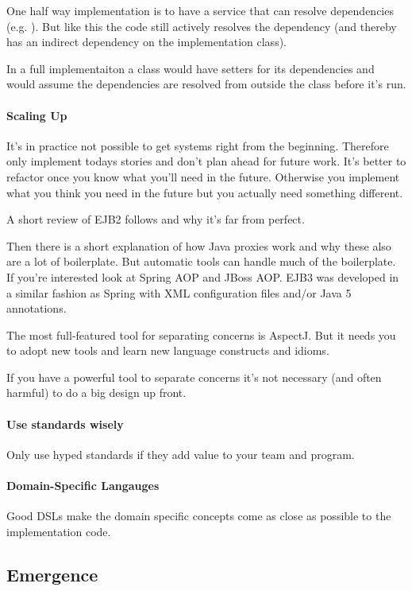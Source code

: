 \documentclass[a4paper, twocolumn]{article}
\newcommand{\code}[1]{\texttt{\color{black}{#1}}}
\begin{document}
One half way implementation is to have a service that can resolve dependencies (e.g. \code{A result = service.get("myA");}). But like this the code still actively resolves the dependency (and thereby has an indirect dependency on the implementation class).

In a full implementaiton a class would have setters for its dependencies and would assume the dependencies are resolved from outside the class before it's run.

\paragraph{Scaling Up}
It's in practice not possible to get systems right from the beginning. Therefore only implement todays stories and don't plan ahead for future work. It's better to refactor once you know what you'll need in the future. Otherwise you implement what you think you need in the future but you actually need something different.

A short review of EJB2 follows and why it's far from perfect.

Then there is a short explanation of how Java proxies work and why these also are a lot of boilerplate. But automatic tools can handle much of the boilerplate. If you're interested look at Spring AOP and JBoss AOP. EJB3 was developed in a similar fashion as Spring with XML configuration files and/or Java 5 annotations.

The most full-featured tool for separating concerns is AspectJ. But it needs you to adopt new tools and learn new language constructs and idioms.

If you have a powerful tool to separate concerns it's not necessary (and often harmful) to do a big design up front.

\paragraph{Use standards wisely} Only use hyped standards if they add value to your team and program.

\paragraph{Domain-Specific Langauges} Good DSLs make the domain specific concepts come as close as possible to the implementation code.

\subsection{Emergence}
\end{document}
